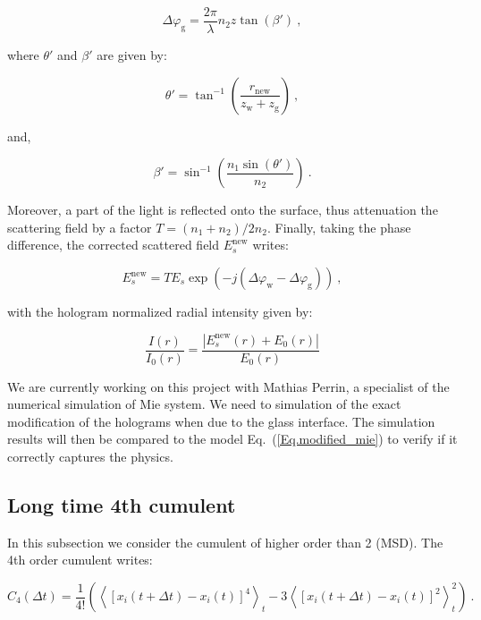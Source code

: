 \begin{equation}
	\Delta \varphi_\mathrm{g} = \frac{2 \pi}{\lambda} n_2 z \tan(\beta ')~,
\end{equation}

where $\theta '$ and $\beta '$ are given by:

\begin{equation}
	\theta ' = \tan ^{-1} \left( \frac{r_\mathrm{new}}{z_\mathrm{w} + z_\mathrm{g}}\right) ~,
\end{equation}

and,

\begin{equation}
	\beta ' = \sin ^{-1} \left(\frac{n_1 \sin (\theta ')}{n_2}\right) ~.
\end{equation}

Moreover, a part of the light is reflected onto the surface, thus attenuation the scattering field by a factor $T = (n_1+n_2) / 2n_2$. Finally, taking the phase difference, the corrected scattered field $E^\mathrm{new} _s$ writes:

\begin{equation}
	E_s^\mathrm{new} = TE_s \exp(-j(\Delta \varphi_\mathrm{w} - \Delta \varphi_\mathrm{g})) ~,
\end{equation}

with the hologram normalized radial intensity given by:

\begin{equation}
	\frac{I(r)}{I_0(r)} = \frac{|E_s^\mathrm{new}(r) + E_0(r)|}{E_0(r)}
	\label{Eq.modified_mie}
\end{equation}

We are currently working on this project with Mathias Perrin, a specialist of the numerical simulation of Mie system. We need to simulation of the exact modification of the holograms when due to the glass interface. The simulation results will then be compared to the model Eq.~(\ref{Eq.modified_mie}) to verify if it correctly captures the physics. 


\subsection{Long time 4th cumulent}

In this subsection we consider the cumulent of higher order than 2 (\gls{MSD}). The 4th order cumulent writes:

\begin{equation}
	C_4 (\Delta t) = \frac{1}{4!} \left(
	\left\langle [ x_i(t + \Delta t) - x_i(t) ]^4 \right\rangle_t
	- 3\left\langle [ x_i(t + \Delta t) - x_i(t) ]^2 \right\rangle_t ^2
	\right) ~.
	\label{c4}
\end{equation}

